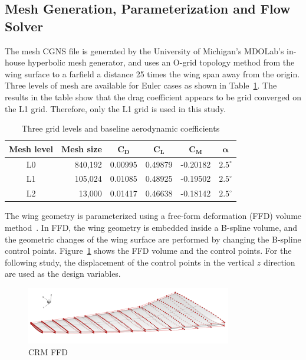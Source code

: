 \subsection{Mesh Generation, Parameterization and Flow Solver}
The mesh CGNS file is generated by the University of Michigan's MDOLab's in-house hyperbolic mesh generator, and uses an O-grid topology method from the wing surface to a farfield a distance 25 times the wing span away from the origin. Three levels of mesh are available for Euler cases as shown in Table~\ref{tab:euler_mesh}. 
The results in the table show that the drag coefficient appears to be grid converged on the L1 grid. Therefore, only the L1 grid is used in this study. 

\begin{table}[H]
  \begin{center}
    \caption{Three grid levels and baseline aerodynamic coefficients
    \label{tab:euler_mesh}}
  \begin{tabular}{ c r c c c c }
 \textbf{Mesh level}   &  \textbf{Mesh size}  & $\mathbf{C_D}$ & $\mathbf{C_L} $ & $\mathbf{C_M}$ & $\mathbf{\alpha}$  \\\hline
 L0                  &  840,192   & 0.00995   & 0.49879 & -0.20182  & $2.5^{\circ}$   \\
 L1                  &  105,024   & 0.01085   & 0.48925 & -0.19502    & $2.5^{\circ}$ \\
 L2 		      &   13,000    &  0.01417   & 0.46638    & -0.18142  &  	$2.5^{\circ}$ 	 
  \end{tabular}
  \end{center}
\end{table}

The wing geometry is parameterized using a free-form deformation (FFD) volume method~\cite{Kenway:2010:C}. In FFD, the wing geometry is embedded inside a B-spline volume, and the geometric changes of the wing surface are performed by changing the B-spline control points.
Figure~\ref{fig:crm_ffd} shows the FFD volume and the control points. For the following study, the displacement of the control points in the vertical $z$ direction are used as the design variables. 

 \begin{figure}[tbp]
  \centering
  \includegraphics[clip,width=0.8\textwidth]{./figs/chap7_aso/CRM-wing-FFD.png}%
  \caption{CRM FFD \label{fig:crm_ffd}}
\end{figure}

